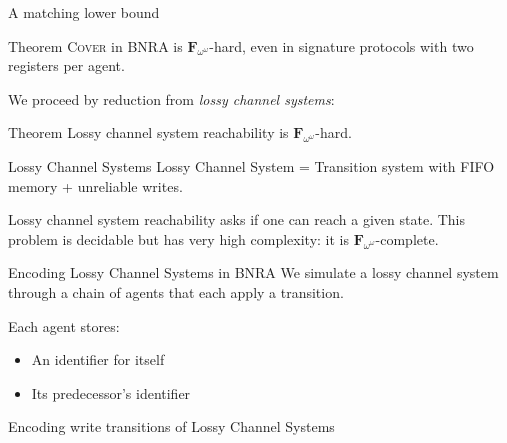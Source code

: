 \documentclass{beamer}
\newcommand{\COVER}{\textsc{Cover}\xspace}
\begin{document}
\begin{frame}{A matching lower bound}
		\begin{block}{Theorem}
		{\COVER} in BNRA is $\mathbf{F}_{\omega^\omega}$-hard, even in signature protocols with two registers per agent.
	\end{block}

	\pause 
	We proceed by reduction from \emph{lossy channel systems}: 
	
	\begin{block}{Theorem\footnotemark}
		Lossy channel system reachability is $\mathbf{F}_{\omega^\omega}$-hard.
	\end{block}

\end{frame}


\begin{frame}{Lossy Channel Systems}
	Lossy Channel System = Transition system with FIFO memory + unreliable writes.
	
	\begin{center}
	\resizebox{!}{4.5cm}{
	
	}
	\end{center}

	 Lossy channel system reachability asks if one can reach a given state. This problem is decidable but has very high complexity: it is $\mathbf{F}_{\omega^\omega}$-complete. 
\end{frame}


\begin{frame}{Encoding Lossy Channel Systems in BNRA}
	We simulate a lossy channel system through a chain of agents that each apply a transition.
	
	Each agent stores:
	\begin{itemize}
		\item An identifier for itself
		
		\item Its predecessor's identifier
	\end{itemize} 
	
	\centering
	
	
\end{frame}


\begin{frame}{Encoding write transitions of Lossy Channel Systems}
	\centering
	

\end{frame}
\end{document}
